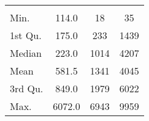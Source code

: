 \begin{tabular}{lS[table-format=5.1]S[table-format=5.1]S[table-format=5.1]}
&  &  &  \\
 Min.    & 114.0 & 18 & 35 \\
 1st Qu. & 175.0 & 233 & 1439 \\
 Median  & 223.0 & 1014 & 4207 \\
 Mean    & 581.5 & 1341 & 4045 \\
 3rd Qu. & 849.0 & 1979 & 6022 \\
 Max.    & 6072.0 & 6943 & 9959 \\
\end{tabular}
